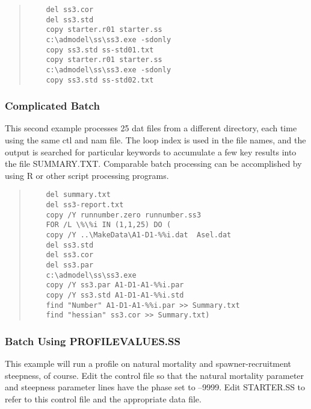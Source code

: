 \begin{quote}
	\begin{verbatim}
	del ss3.cor
	del ss3.std
	copy starter.r01 starter.ss
	c:\admodel\ss\ss3.exe -sdonly
	copy ss3.std ss-std01.txt
	copy starter.r01 starter.ss
	c:\admodel\ss\ss3.exe -sdonly
	copy ss3.std ss-std02.txt
	\end{verbatim}
\end{quote}


\subsubsection{Complicated Batch}
This second example processes 25 dat files from a different directory, each time using the same ctl and nam file.  The loop index is used in the file names, and the output is searched for particular keywords to accumulate a few key results into the file SUMMARY.TXT.  Comparable batch processing can be accomplished by using R or other script processing programs.

\begin{quote}
	\begin{verbatim}
	del summary.txt
	del ss3-report.txt
	copy /Y runnumber.zero runnumber.ss3
	FOR /L \%\%i IN (1,1,25) DO (
	copy /Y ..\MakeData\A1-D1-%%i.dat  Asel.dat
	del ss3.std
	del ss3.cor
	del ss3.par
	c:\admodel\ss\ss3.exe
	copy /Y ss3.par A1-D1-A1-%%i.par
	copy /Y ss3.std A1-D1-A1-%%i.std
	find "Number" A1-D1-A1-%%i.par >> Summary.txt
	find "hessian" ss3.cor >> Summary.txt)
	\end{verbatim}
\end{quote}



\subsubsection{Batch Using PROFILEVALUES.SS}
This example will run a profile on natural mortality and spawner-recruitment steepness, of course.  Edit the control file so that the natural mortality parameter and steepness parameter lines have the phase set to –9999.  Edit STARTER.SS to refer to this control file and the appropriate data file.

